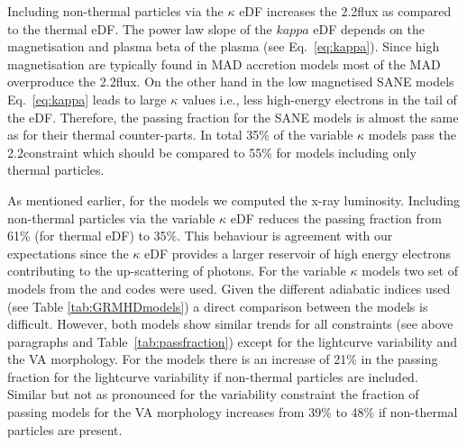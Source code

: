 Including non-thermal particles via the $\kappa$ eDF increases the 2.2\um flux as compared to the thermal eDF. The power law slope of the $kappa$ eDF depends on the magnetisation and plasma beta of the plasma (see Eq.~\ref{eq:kappa}). Since high magnetisation are typically found in MAD accretion models most of the MAD overproduce the 2.2\um flux. On the other hand in the low magnetised SANE models Eq.~\ref{eq:kappa} leads to large $\kappa$ values i.e., less high-energy electrons in the tail of the eDF. Therefore, the passing fraction for the SANE models is almost the same as for their thermal counter-parts. In total 35\% of the variable $\kappa$ models pass the 2.2\um constraint which should be compared to 55\% for models including only thermal particles.

As mentioned earlier, for the \hamr models we computed the x-ray luminosity. Including non-thermal particles via the variable $\kappa$ eDF reduces the passing fraction from 61\% (for thermal eDF) to 35\%. This behaviour is agreement with our expectations since the $\kappa$ eDF provides a larger reservoir of high energy electrons contributing to the up-scattering of photons.   
For the variable $\kappa$ models two set of models from the \bhac and \hamr codes were used. Given the different adiabatic indices used (see Table \ref{tab:GRMHDmodels}) a direct comparison between the models is difficult. However, both models show similar trends for all constraints (see above paragraphs and Table~\ref{tab:passfraction}) except for the lightcurve variability and the VA morphology. For the \hamr models there is an increase of 21\% in the passing fraction for the lightcurve variability if non-thermal particles are included. Similar but not as pronounced for the variability constraint the fraction of passing models for the VA morphology increases from 39\% to 48\% if non-thermal particles are present.


